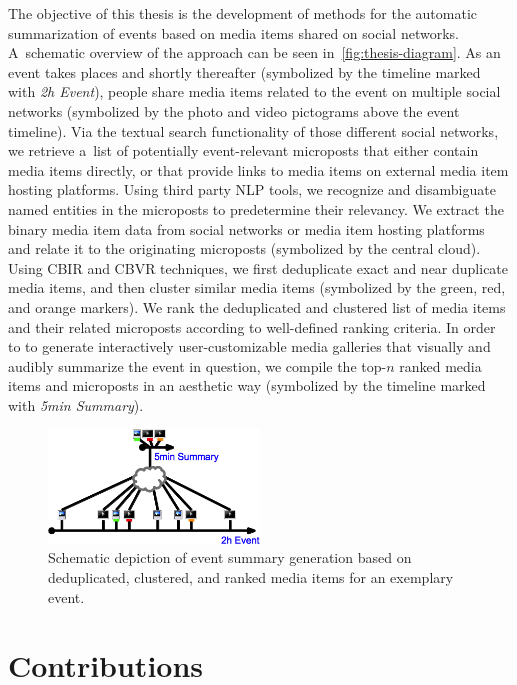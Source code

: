 The objective of this thesis is the development
of methods for the automatic summarization of events
based on media items shared on social networks.
A~schematic overview of the approach can be seen
in~\autoref{fig:thesis-diagram}.
As an event takes places and shortly thereafter
(symbolized by the timeline marked with \emph{2h Event}),
people share media items related to the event
on multiple social networks
(symbolized by the photo and video pictograms
above the event timeline).
Via the textual search functionality of those
different social networks,
we retrieve a~list of potentially event-relevant
microposts that either contain media items directly,
or that provide links to media items
on external media item hosting platforms.
Using third party NLP tools,
we recognize and disambiguate named entities
in the microposts to predetermine their relevancy.
We extract the binary media item data
from social networks or media item hosting platforms
and relate it to the originating microposts
(symbolized by the central cloud).
Using CBIR and CBVR techniques, we first deduplicate
exact and near duplicate media items,
and then cluster similar media items
(symbolized by the green, red, and orange markers).
We rank the deduplicated and clustered list
of media items and their related microposts
according to well-defined ranking criteria.
In order to to generate interactively user-customizable
media galleries that visually and audibly summarize the
event in question, we compile the top-$n$ ranked
media items and microposts in an aesthetic way
(symbolized by the timeline marked with \emph{5min Summary}).

\begin{figure}[h!]
  \centering
  \includegraphics[width=0.5\textwidth]{thesis-diagram.png}
  \caption{Schematic depiction of event summary generation
    based on deduplicated, clustered, and ranked media items
    for an exemplary event.}
  \label{fig:thesis-diagram}
\end{figure}

\section{Contributions}

